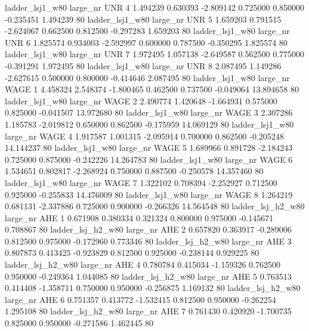     ladder_lsj1_w80   large_nr      UNR                 4  1.494239  0.630393  -2.809142 0.725000 0.850000 -0.235451    1.494239 80
    ladder_lsj1_w80   large_nr      UNR                 5  1.659203  0.791515  -2.624067 0.662500 0.812500 -0.297283    1.659203 80
    ladder_lsj1_w80   large_nr      UNR                 6  1.825574  0.934003  -2.592997 0.600000 0.787500 -0.350295    1.825574 80
    ladder_lsj1_w80   large_nr      UNR                 7  1.972495  1.057138  -2.649587 0.562500 0.775000 -0.391291    1.972495 80
    ladder_lsj1_w80   large_nr      UNR                 8  2.087495  1.149286  -2.627615 0.500000 0.800000 -0.414646    2.087495 80
    ladder_lsj1_w80   large_nr     WAGE                 1  4.458324  2.548374  -1.800465 0.462500 0.737500 -0.049064   13.894658 80
    ladder_lsj1_w80   large_nr     WAGE                 2  2.490774  1.420648  -1.664931 0.575000 0.825000 -0.041507   13.972680 80
    ladder_lsj1_w80   large_nr     WAGE                 3  2.307286  1.185783  -2.019812 0.650000 0.862500 -0.175959   14.069129 80
    ladder_lsj1_w80   large_nr     WAGE                 4  1.917587  1.001315  -2.095914 0.700000 0.862500 -0.205248   14.144237 80
    ladder_lsj1_w80   large_nr     WAGE                 5  1.689966  0.891728  -2.184243 0.725000 0.875000 -0.242226   14.264783 80
    ladder_lsj1_w80   large_nr     WAGE                 6  1.534651  0.802817  -2.268924 0.750000 0.887500 -0.250578   14.357460 80
    ladder_lsj1_w80   large_nr     WAGE                 7  1.322102  0.708394  -2.252927 0.712500 0.925000 -0.255833   14.476009 80
    ladder_lsj1_w80   large_nr     WAGE                 8  1.264219  0.681131  -2.337886 0.725000 0.900000 -0.266326   14.564548 80
  ladder_lsj_h2_w80   large_nr      AHE                 1  0.671908  0.380334   0.321324 0.800000 0.975000 -0.145671    0.708867 80
  ladder_lsj_h2_w80   large_nr      AHE                 2  0.657820  0.363917  -0.289006 0.812500 0.975000 -0.172960    0.773346 80
  ladder_lsj_h2_w80   large_nr      AHE                 3  0.807873  0.413425  -0.923829 0.812500 0.925000 -0.238144    0.929225 80
  ladder_lsj_h2_w80   large_nr      AHE                 4  0.780784  0.415034  -1.159326 0.762500 0.950000 -0.249364    1.044085 80
  ladder_lsj_h2_w80   large_nr      AHE                 5  0.763513  0.414408  -1.358711 0.750000 0.950000 -0.256875    1.169132 80
  ladder_lsj_h2_w80   large_nr      AHE                 6  0.751357  0.413772  -1.532415 0.812500 0.950000 -0.262254    1.295108 80
  ladder_lsj_h2_w80   large_nr      AHE                 7  0.761430  0.420920  -1.700735 0.825000 0.950000 -0.271586    1.462445 80
